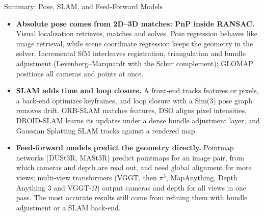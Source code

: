 \begin{frame}{Summary: Pose, SLAM, and Feed-Forward Models}
  \begin{itemize}\footnotesize\itemsep0.45em
    \item \textbf{Absolute pose comes from 2D--3D matches: PnP inside RANSAC.} Visual localization retrieves, matches and solves. Pose regression behaves like image retrieval, while scene coordinate regression keeps the geometry in the solver. Incremental SfM interleaves registration, triangulation and bundle adjustment (Levenberg--Marquardt with the Schur complement); GLOMAP positions all cameras and points at once.
    \item \textbf{SLAM adds time and loop closure.} A front-end tracks features or pixels, a back-end optimizes keyframes, and loop closure with a Sim(3) pose graph removes drift. ORB-SLAM matches features, DSO aligns pixel intensities, DROID-SLAM learns its updates under a dense bundle adjustment layer, and Gaussian Splatting SLAM tracks against a rendered map.
    \item \textbf{Feed-forward models predict the geometry directly.} Pointmap networks (DUSt3R, MASt3R) predict pointmaps for an image pair, from which cameras and depth are read out, and need global alignment for more views; multi-view transformers (VGGT, then $\pi^3$, MapAnything, Depth Anything 3 and VGGT-$\Omega$) output cameras and depth for all views in one pass. The most accurate results still come from refining them with bundle adjustment or a SLAM back-end.
  \end{itemize}
\end{frame}
